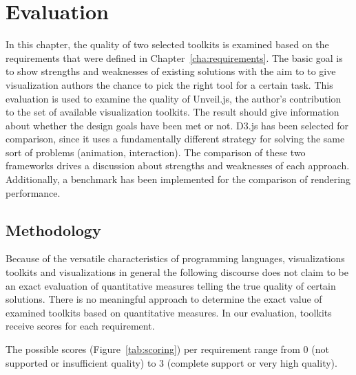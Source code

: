 \chapter{Evaluation}
\label{cha:evaluation}

In this chapter, the quality of two selected toolkits is examined based on the requirements that were defined in Chapter~\ref{cha:requirements}. The basic goal is to show strengths and weaknesses of existing solutions with the aim to to give visualization authors the chance to pick the right tool for a certain task. This evaluation is used to examine the quality of Unveil.js, the author's contribution to the set of available visualization toolkits. The result should give information about whether the design goals have been met or not. D3.js has been selected for comparison, since it uses a fundamentally different strategy for solving the same sort of problems (animation, interaction). The comparison of these two frameworks drives a discussion about strengths and weaknesses of each approach. Additionally, a benchmark has been implemented for the comparison of rendering performance.

\section{Methodology}

Because of the versatile characteristics of programming languages, visualizations toolkits and visualizations in general the following discourse does not claim to be an exact evaluation of quantitative measures telling the true quality of certain solutions. There is no meaningful approach to determine the exact value of examined toolkits based on quantitative measures. In our evaluation, toolkits receive scores for each requirement. 



The possible scores (Figure~\ref{tab:scoring}) per requirement range from 0 (not supported or insufficient quality) to 3 (complete support or very high quality).

